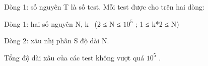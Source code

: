 Dòng 1: số nguyên T là số test. Mỗi test được cho trên hai dòng:  

   Dòng 1: hai số nguyên N, k  (2 ≤ N ≤ $10^{5}$   ; 1 ≤ k*2 ≤ N)  

   Dòng 2: xâu nhị phân S độ dài N.  

   Tổng độ dài xâu của các test không vượt quá $10^{5}$   .